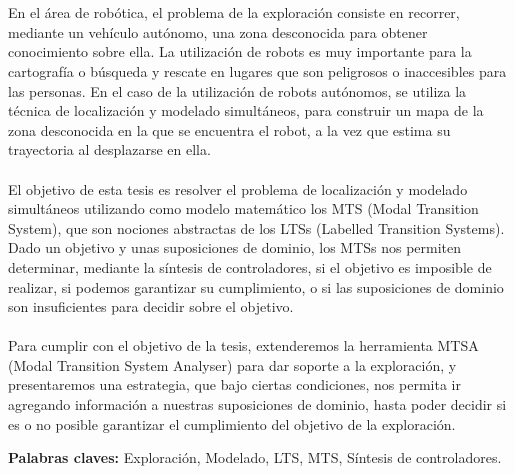 \chapter*{\runtitulo}

\noindent
En el área de robótica, el problema de la exploración consiste en recorrer, mediante un vehículo autónomo,
una zona desconocida para obtener conocimiento sobre ella. La utilización de robots es muy importante para
la cartografía o búsqueda y rescate en lugares que son peligrosos o inaccesibles para las personas. 
En el caso de la utilización de robots autónomos, se utiliza la técnica de localización y modelado simultáneos, 
para construir un mapa de la zona desconocida en la que se encuentra el robot, a la vez que estima su 
trayectoria al desplazarse en ella.
\\\\
El objetivo de esta tesis es resolver el problema de localización y modelado simultáneos utilizando como modelo 
matemático los MTS (Modal Transition System), que son nociones abstractas de los LTSs (Labelled Transition Systems).
\\
Dado un objetivo y unas suposiciones de dominio, los MTSs nos permiten determinar, mediante la síntesis de 
controladores, si el objetivo es imposible de realizar, si podemos garantizar su cumplimiento, o si las suposiciones
de dominio son insuficientes para decidir sobre el objetivo.
\\\\
Para cumplir con el objetivo de la tesis, extenderemos la herramienta MTSA (Modal Transition System Analyser) para
dar soporte a la exploración, y presentaremos una estrategia, que bajo ciertas condiciones, nos permita ir agregando 
información a nuestras suposiciones de dominio, hasta poder decidir si es o no posible garantizar el cumplimiento del
objetivo de la exploración.



\bigskip

\noindent\textbf{Palabras claves:} Exploración, Modelado, LTS, MTS, Síntesis de controladores.